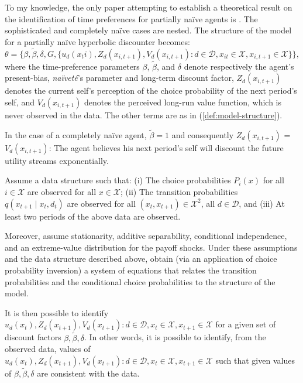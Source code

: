 To my knowledge, the only paper attempting to establish a theoretical result on the identification of time preferences for partially naïve agents is \textcite{FangWang2015}. The sophisticated and completely naïve cases are nested. The structure of the model for a partially naïve hyperbolic discounter becomes:
\begin{equation}
\theta = \{\beta, \tilde{\beta}, \delta, G, \{u_d(x_ti), Z_d(x_{i,t+1}), V_d(x_{i,t+1}): d \in \mathcal{D}, x_{it} \in \mathcal{X}, x_{i,t+1} \in \mathcal{X}\}\},
\end{equation}
where the time-preference parameters $\beta$, $\tilde{\beta}$, and $\delta$ denote respectively the agent's present-bias, \textit{naïveté}'s parameter and long-term discount factor, $Z_d(x_{i,t+1})$ denotes the current self's perception of the choice probability of the next period's self, and $V_d(x_{i,t+1})$ denotes the perceived long-run value function, which is never observed in the data. The other terms are as in (\ref{def:model-structure}).

In the case of a completely naïve agent, $\tilde{\beta} = 1$ and consequently $Z_d(x_{i,t+1})$ = $V_d(x_{i,t+1})$: The agent believes his next period's self will discount the future utility streams exponentially.

Assume a data structure such that: (i) The choice probabilities $P_i(x)$ for all $i \in \mathcal{X}$ are observed for all $x \in \mathcal{X}$; (ii) The transition probabilities $q(x_{t+1} \mid x_t, d_t)$ are observed for all $(x_t, x_{t+1}) \in \mathcal{X}^2$, all $d \in \mathcal{D}$, and (iii) At least two periods of the above data are observed.

Moreover, assume stationarity, additive separability, conditional independence, and an extreme-value distribution for the payoff shocks. Under these assumptions and the data structure described above, \textcite{FangWang2015} obtain (via an application of \textcite{HotzMiller1993} choice probability inversion) a system of equations that relates the transition probabilities and the conditional choice probabilities to the structure of the model.

It is then possible to identify $u_d(x_t), Z_d(x_{t+1}), V_d(x_{t+1}): d \in \mathcal{D}, x_t \in \mathcal{X}, x_{t+1} \in \mathcal{X}$ for a given set of discount factors $\beta, \tilde{\beta}, \delta$. In other words, it is possible to identify, from the observed data, values of $u_d(x_t), Z_d(x_{t+1}), V_d(x_{t+1}): d \in \mathcal{D}, x_t \in \mathcal{X}, x_{t+1} \in \mathcal{X}$ such that given values of $\beta, \tilde{\beta}, \delta$ are consistent with the data.

